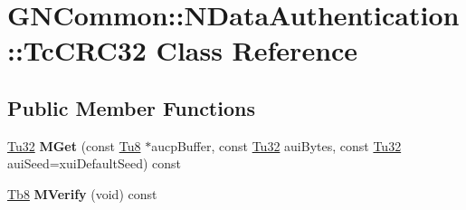 \hypertarget{class_g_n_common_1_1_n_data_authentication_1_1_tc_c_r_c32}{}\section{G\+N\+Common\+:\+:N\+Data\+Authentication\+:\+:Tc\+C\+R\+C32 Class Reference}
\label{class_g_n_common_1_1_n_data_authentication_1_1_tc_c_r_c32}
\subsection*{Public Member Functions}
\begin{DoxyCompactItemize}
\item 
\mbox{\label{class_g_n_common_1_1_n_data_authentication_1_1_tc_c_r_c32_a36b1cd53c1d73118b102746f482ff870}} 
\mbox{\hyperlink{namespace_g_n_common_a941b527ef318f318aed7903dc832b7e4}{Tu32}} {\bfseries M\+Get} (const \mbox{\hyperlink{namespace_g_n_common_a7939e251ddbf5d3a31832dcfdc8bde39}{Tu8}} $\ast$aucp\+Buffer, const \mbox{\hyperlink{namespace_g_n_common_a941b527ef318f318aed7903dc832b7e4}{Tu32}} aui\+Bytes, const \mbox{\hyperlink{namespace_g_n_common_a941b527ef318f318aed7903dc832b7e4}{Tu32}} aui\+Seed=xui\+Default\+Seed) const
\item 
\mbox{\label{class_g_n_common_1_1_n_data_authentication_1_1_tc_c_r_c32_a8d798a894e55e69f847392f72fc2e84d}} 
\mbox{\hyperlink{namespace_g_n_common_a8115dc7ed53b6e5b52e6bfde1632ea74}{Tb8}} {\bfseries M\+Verify} (void) const
\end{DoxyCompactItemize}
